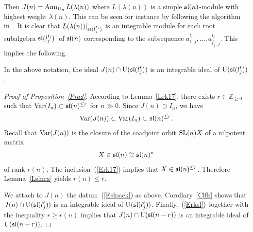 \documentclass[10pt]{amsart}\oddsidemargin -1mm \evensidemargin -1mm \topmargin -15mm\headheight5mm \headsep 3.5mm \textheight 245mm\textwidth 170mm %
\begin{document}
Then $J(n)=\operatorname{\mathrm{Ann}}_{\operatorname{\mathrm{U}}_n}L(\lambda(n))$ where $L(\lambda(n))$ is a simple $\frak{sl}(n)$-module with highest weight $\lambda(n)$. This can be seen for instance by following the algorithm in~\cite[Subsection 4.2]{PP2}. It is clear that $L(\lambda(n))|_{\frak{sl}(l_j^{t_i})}$ is an integrable module for each root subalgebra $\frak{sl}({l_j^{t_i}})$~of $\frak{sl}(n)$ corresponding to the subsequence $a^{t_i}_{1, j},..., a^{t_i}_{l_j^{t_i}, j}$. This implies the following.
\begin{corollary}\label{Clfk} In the above notation, the ideal $J(n)\cap \operatorname{\mathrm{U}}(\frak{sl}({l_j^t}))$ is an integrable ideal of $\operatorname{\mathrm{U}}(\frak{sl}({l_j^t}))$.\end{corollary}
\begin{proof}[Proof of Proposition~\ref{Prad}]  According to Lemma~\ref{Lrk17}, there exists $r\in\mathbb Z_{\ge0}$ such that $\operatorname{\mathrm{Var}}(I_n)\subset\frak{sl}(n)^{\le r}$ for $n\gg0$. Since $J(n)\supset I_n$, we have \begin{equation}\operatorname{\mathrm{Var}}(J(n))\subset\operatorname{\mathrm{Var}}(I_n)\subset\frak{sl}(n)^{\le r}.\label{Erk17}\end{equation}
Recall that $\operatorname{\mathrm{Var}}(J(n))$ is the closure of the coadjoint orbit ${\rm SL}(n)X$ of a nilpotent matrix $$X\in\frak{sl}(n)\cong\frak{sl}(n)^*$$of rank $r(n)$. 
The inclusion~(\ref{Erk17}) implies that $X\in\frak{sl}(n)^{\le r}$. Therefore Lemma~\ref{Lslnrx} yields $r(n)\le r$.


We attach to $J(n)$ the datum~(\ref{Eslpack}) as above. Corollary~\ref{Clfk} shows that $J(n)\cap \operatorname{\mathrm{U}}(\frak{sl}({l_j^t}))$ is an integrable ideal of $\operatorname{\mathrm{U}}(\frak{sl}({l_j^t}))$. Finally,~(\ref{Erksl}) together with the inequality $r\ge r(n)$ implies that $J(n)\cap \operatorname{\mathrm{U}}(\frak{sl}(n-r))$ is an integrable ideal of $\operatorname{\mathrm{U}}(\frak{sl}(n-r))$.\end{proof}
\end{document}
